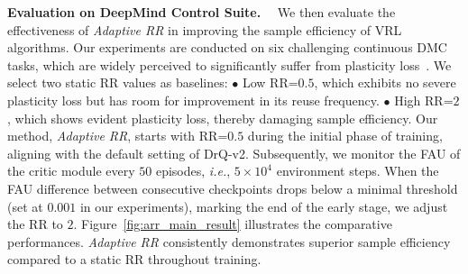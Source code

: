 
\textbf{Evaluation on DeepMind Control Suite.}~~
We then evaluate the effectiveness of \textcolor{AARed}{\textit{Adaptive RR}} in improving the sample efficiency of VRL algorithms.
Our experiments are conducted on six challenging continuous DMC tasks, which are widely perceived to significantly suffer from plasticity loss~\citep{Enhancing_Generalization_Plasticity}.
We select two static RR values as baselines:
\textcolor{AAGray}{$\bullet$ Low RR=$0.5$}, which exhibits no severe plasticity loss but has room for improvement in its reuse frequency.
\textcolor{AABlue}{$\bullet$ High RR=$2$}, which shows evident plasticity loss, thereby damaging sample efficiency.
Our method, \textcolor{AARed}{\textit{Adaptive RR}}, starts with RR=$0.5$ during the initial phase of training, aligning with the default setting of DrQ-v2. Subsequently, we monitor the FAU of the critic module every $50$ episodes, \textit{i.e.}, $5 \times 10^4$ environment steps.
When the FAU difference between consecutive checkpoints drops below a minimal threshold (set at $0.001$ in our experiments), marking the end of the early stage, we adjust the RR to $2$.
Figure~\ref{fig:arr_main_result} illustrates the comparative performances.
\textcolor{AARed}{\textit{Adaptive RR}} consistently demonstrates superior sample efficiency compared to a static RR throughout training.

